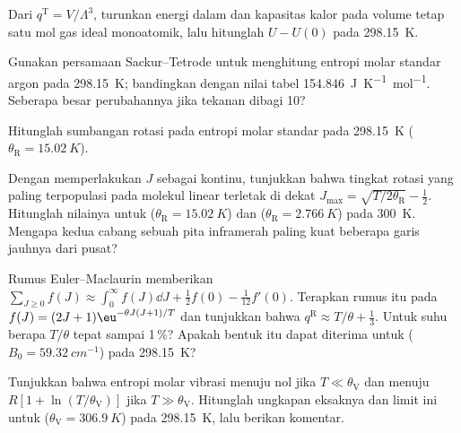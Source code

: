 \begin{exercise}[$\star\star$]\label{exo:b3:partition-functions:7}
Dari $q^{\mathrm T} = V/\Lambda^3$, turunkan energi dalam dan kapasitas kalor
pada volume tetap satu mol gas ideal monoatomik, lalu hitunglah $U - U(0)$
pada \qty{298.15}{K}.
\end{exercise}

\begin{exercise}[$\star\star$]\label{exo:b3:partition-functions:8}
Gunakan persamaan Sackur--Tetrode untuk menghitung entropi molar standar argon
pada \qty{298.15}{K}; bandingkan dengan nilai tabel
\qty{154.846}{J.K^{-1}.mol^{-1}}. Seberapa besar perubahannya jika tekanan
dibagi 10?
\end{exercise}

\begin{exercise}[$\star\star$]\label{exo:b3:partition-functions:9}
Hitunglah sumbangan rotasi pada entropi molar standar  pada
\qty{298.15}{K} ($\theta_{\mathrm R} = \qty{15.02}{K}$).
\end{exercise}

\begin{exercise}[$\star\star\star$]\label{exo:b3:partition-functions:10}
Dengan memperlakukan $J$ sebagai kontinu, tunjukkan bahwa tingkat rotasi yang
paling terpopulasi pada molekul linear terletak di dekat
$J_{\max} = \sqrt{T/2\theta_{\mathrm R}} - \frac12$. Hitunglah nilainya untuk 
($\theta_{\mathrm R} = \qty{15.02}{K}$) dan  ($\theta_{\mathrm R} = \qty{2.766}{K}$) pada
\qty{300}{K}. Mengapa kedua cabang sebuah pita inframerah paling kuat beberapa
garis jauhnya dari pusat?
\end{exercise}

\begin{exercise}[$\star\star\star$]\label{exo:b3:partition-functions:11}
Rumus Euler--Maclaurin memberikan $\sum_{J\ge0}f(J) \approx \int_0^\infty f(J)\dd J + \frac12f(0) -
\frac1{12}f'(0)$. Terapkan rumus itu pada $f(J) = (2J+1)\eu^{-\theta J(J+1)/T}$ dan
tunjukkan bahwa $q^{\mathrm R} \approx T/\theta +
\frac13$. Untuk suhu berapa $T/\theta$ tepat sampai 1\,\%? Apakah bentuk itu dapat
diterima untuk  ($B_0 = \qty{59.32}{cm^{-1}}$) pada \qty{298.15}{K}?
\end{exercise}

\begin{exercise}[$\star\star\star$]\label{exo:b3:partition-functions:12}
Tunjukkan bahwa entropi molar vibrasi menuju nol jika $T \ll \theta_{\mathrm V}$ dan
menuju $R[1 + \ln(T/\theta_{\mathrm V})]$ jika $T \gg \theta_{\mathrm V}$. Hitunglah ungkapan
eksaknya dan limit ini untuk  ($\theta_{\mathrm V} = \qty{306.9}{K}$) pada
\qty{298.15}{K}, lalu berikan komentar.
\end{exercise}

